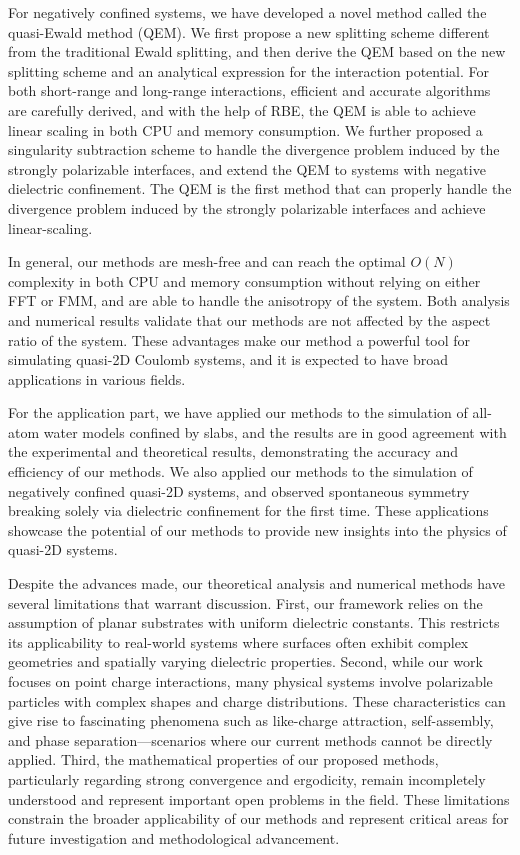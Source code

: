 For negatively confined systems, we have developed a novel method called the quasi-Ewald method (QEM).
We first propose a new splitting scheme different from the traditional Ewald splitting, and then derive the QEM based on the new splitting scheme and an analytical expression for the interaction potential.
For both short-range and long-range interactions, efficient and accurate algorithms are carefully derived, and with the help of RBE, the QEM is able to achieve linear scaling in both CPU and memory consumption.
We further proposed a singularity subtraction scheme to handle the divergence problem induced by the strongly polarizable interfaces, and extend the QEM to systems with negative dielectric confinement.
The QEM is the first method that can properly handle the divergence problem induced by the strongly polarizable interfaces and achieve linear-scaling.


In general, our methods are mesh-free and can reach the optimal $O(N)$ complexity in both CPU and memory consumption without relying on either FFT or FMM, and are able to handle the anisotropy of the system.
Both analysis and numerical results validate that our methods are not affected by the aspect ratio of the system.
These advantages make our method a powerful tool for simulating quasi-2D Coulomb systems, and it is expected to have broad applications in various fields.

For the application part, we have applied our methods to the simulation of all-atom water models confined by slabs, and the results are in good agreement with the experimental and theoretical results, demonstrating the accuracy and efficiency of our methods.
We also applied our methods to the simulation of negatively confined quasi-2D systems, and observed spontaneous symmetry breaking solely via dielectric confinement for the first time.
These applications showcase the potential of our methods to provide new insights into the physics of quasi-2D systems.

Despite the advances made, our theoretical analysis and numerical methods have several limitations that warrant discussion.
First, our framework relies on the assumption of planar substrates with uniform dielectric constants.
This restricts its applicability to real-world systems where surfaces often exhibit complex geometries and spatially varying dielectric properties.
Second, while our work focuses on point charge interactions, many physical systems involve polarizable particles with complex shapes and charge distributions.
These characteristics can give rise to fascinating phenomena such as like-charge attraction, self-assembly, and phase separation---scenarios where our current methods cannot be directly applied.
Third, the mathematical properties of our proposed methods, particularly regarding strong convergence and ergodicity, remain incompletely understood and represent important open problems in the field.
These limitations constrain the broader applicability of our methods and represent critical areas for future investigation and methodological advancement.


